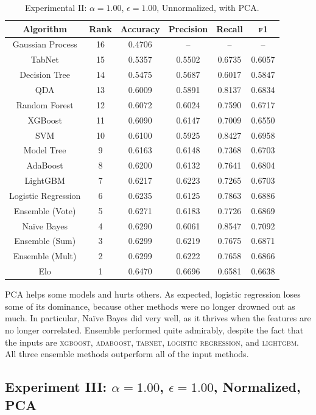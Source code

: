 \documentclass[10pt]{article}
\begin{document}
\begin{table}[htbp]
\centering
\begin{tabular}{|c|c|c|c|c|c|}
\hline
Algorithm & Rank & Accuracy & Precision & Recall & \textsc{f1} \\ \hline
Gaussian Process & 16 & 0.4706 & -- & -- & -- \\
TabNet & 15 & 0.5357 & 0.5502 & 0.6735 & 0.6057 \\
Decision Tree & 14 & 0.5475 & 0.5687 & 0.6017 & 0.5847 \\
QDA & 13 & 0.6009 & 0.5891 & 0.8137 & 0.6834 \\
Random Forest & 12 & 0.6072 & 0.6024 & 0.7590 & 0.6717 \\
XGBoost & 11 & 0.6090 & 0.6147 & 0.7009 & 0.6550 \\
SVM & 10 & 0.6100 & 0.5925 & 0.8427 & 0.6958 \\
Model Tree & 9 & 0.6163 & 0.6148 & 0.7368 & 0.6703 \\
AdaBoost & 8 & 0.6200 & 0.6132 & 0.7641 & 0.6804 \\
LightGBM & 7 & 0.6217 & 0.6223 & 0.7265 & 0.6703 \\ \hline
Logistic Regression & 6 & 0.6235 & 0.6125 & 0.7863 & 0.6886 \\ \hline
Ensemble (Vote) & 5 & 0.6271 & 0.6183 & 0.7726 & 0.6869 \\
Na\"ive Bayes & 4 & 0.6290 & 0.6061 & 0.8547 & 0.7092 \\
Ensemble (Sum) & 3 & 0.6299 & 0.6219 & 0.7675 & 0.6871 \\
Ensemble (Mult) & 2 & 0.6299 & 0.6222 & 0.7658 & 0.6866 \\
Elo & 1 & 0.6470 & 0.6696 & 0.6581 & 0.6638 \\
\hline
\end{tabular}
\caption{Experimental II: $\alpha=1.00$, $\epsilon = 1.00$, Unnormalized, with PCA.}
\label{table:experiment-II}
\end{table}

PCA helps some models and hurts others. As expected, logistic regression
loses some of its dominance, because other methods were no longer drowned
out as much. In particular,
Na\"ive Bayes did very well, as it thrives when the features are
no longer correlated. Ensemble performed quite admirably,
despite the fact that the inputs are
\textsc{xgboost}, 
\textsc{adaboost}, 
\textsc{tabnet}, 
\textsc{logistic regression}, and
\textsc{lightgbm}. All three ensemble methods outperform all of the
input methods.

\subsection{Experiment III: $\alpha=1.00$, $\epsilon = 1.00$, Normalized, PCA}
\end{document}
